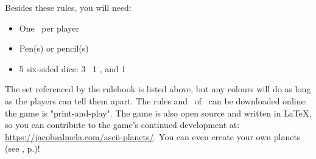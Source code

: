 Besides these rules, you will need:
\begin{itemize}
	\item One \planetsheet\ per player
	\item Pen(s) or pencil(s)
	\item 5 six-sided dice: 3 \whitedice\ 1 \bluedie, and 1 \blackdie\
\end{itemize}
The set referenced by the rulebook is listed above, but any colours will do as long as the players can tell them apart.
\newline\newline
The rules and \planetsheet\ of \asciiplanets\ can be downloaded online: the game is "print-and-play".
\newline\newline
The game is also open source and written in LaTeX, so you can contribute to the game's continued development at: \url{https://jacobsalmela.com/ascii-planets/}.  You can even create your own planets (see , p.\pageref{sec:customizing})!
